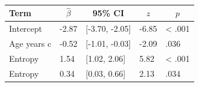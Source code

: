 \documentclass[
  english,
  ,man,floatsintext]{apa6}
\begin{document}
\begin{table}[tbp]

\begin{center}
\begin{threeparttable}

\caption{\label{tab:study2-accuracyspanishentropy}}

\begin{tabular}{lllll}
\toprule
Term & \multicolumn{1}{c}{$\hat{\beta}$} & \multicolumn{1}{c}{95\% CI} & \multicolumn{1}{c}{$z$} & \multicolumn{1}{c}{$p$}\\
\midrule
Intercept & -2.87 & [-3.70, -2.05] & -6.85 & < .001\\
Age years c & -0.52 & [-1.01, -0.03] & -2.09 & .036\\
Entropy & 1.54 & [1.02, 2.06] & 5.82 & < .001\\
Entropy & 0.34 & [0.03, 0.66] & 2.13 & .034\\
\bottomrule
\end{tabular}

\end{threeparttable}
\end{center}

\end{table}
\end{document}
